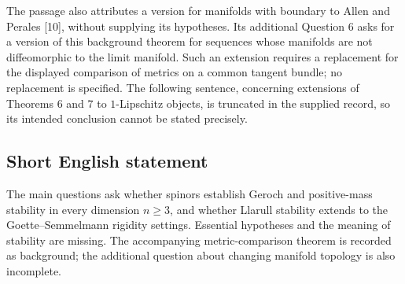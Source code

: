 \documentclass[11pt]{article}
\begin{document}
The passage also attributes a version for manifolds with boundary to Allen and Perales [10], without supplying its hypotheses. Its additional Question 6 asks for a version of this background theorem for sequences whose manifolds are not diffeomorphic to the limit manifold. Such an extension requires a replacement for the displayed comparison of metrics on a common tangent bundle; no replacement is specified. The following sentence, concerning extensions of Theorems 6 and 7 to \(1\)-Lipschitz objects, is truncated in the supplied record, so its intended conclusion cannot be stated precisely.
\subsection{Short English statement}
The main questions ask whether spinors establish Geroch and positive-mass stability in every dimension \(n\geq3\), and whether Llarull stability extends to the Goette--Semmelmann rigidity settings. Essential hypotheses and the meaning of stability are missing. The accompanying metric-comparison theorem is recorded as background; the additional question about changing manifold topology is also incomplete.
\end{document}
